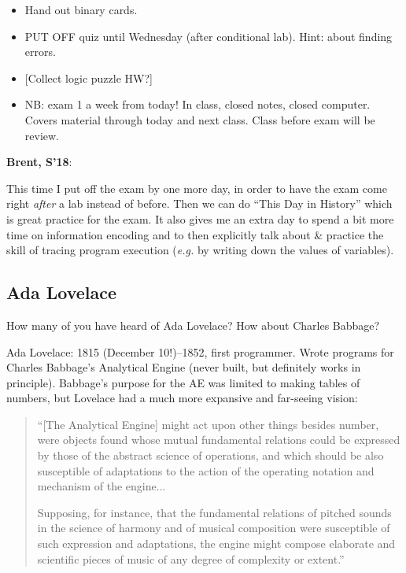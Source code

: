 \documentclass{article}
\newenvironment{reflect}[1]
{
  \noindent
  \begin{lrbox}{\reflectbox}
    \begin{minipage}[t]{\textwidth}
      \textbf{#1}:
}{
    \end{minipage}
  \end{lrbox}
  \fbox{\usebox{\reflectbox}}
}
\begin{document}
\begin{itemize}
\item Hand out binary cards.
\item PUT OFF quiz until Wednesday (after conditional lab).  Hint:
  about finding errors.
\item{} [Collect logic puzzle HW?]
\item NB: exam 1 a week from today!  In class, closed notes, closed
  computer.  Covers material through today and next class. Class
  before exam will be review.
\end{itemize}
\begin{reflect}{Brent, S'18}
  This time I put off the exam by one more day, in order to have the
  exam come right \emph{after} a lab instead of before.  Then we can
  do ``This Day in History'' which is great practice for the exam.  It
  also gives me an extra day to spend a bit more time on information
  encoding and to then explicitly talk about \& practice the skill of
  tracing program execution (\emph{e.g.} by writing down the values of
  variables).
\end{reflect}

\subsection*{Ada Lovelace}

How many of you have heard of Ada Lovelace?  How about Charles
Babbage?

Ada Lovelace: 1815 (December 10!)--1852, first programmer.  Wrote
programs for Charles Babbage's Analytical Engine (never built, but
definitely works in principle).  Babbage's purpose for the AE was
limited to making tables of numbers, but Lovelace had a much more
expansive and far-seeing vision:

\begin{quote}
``[The Analytical Engine] might act upon other things besides number,
were objects found whose mutual fundamental relations could be
expressed by those of the abstract science of operations, and which
should be also susceptible of adaptations to the action of the
operating notation and mechanism of the engine...

Supposing, for instance, that the fundamental relations of pitched
sounds in the science of harmony and of musical composition were
susceptible of such expression and adaptations, the engine might
compose elaborate and scientific pieces of music of any degree of
complexity or extent.''
\end{quote}
\end{document}
